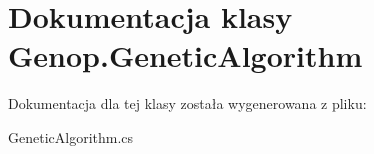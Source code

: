 \hypertarget{classGenop_1_1GeneticAlgorithm}{}\section{Dokumentacja klasy Genop.\+Genetic\+Algorithm}
\label{classGenop_1_1GeneticAlgorithm}


Dokumentacja dla tej klasy została wygenerowana z pliku\+:\begin{DoxyCompactItemize}
\item 
Genetic\+Algorithm.\+cs\end{DoxyCompactItemize}
